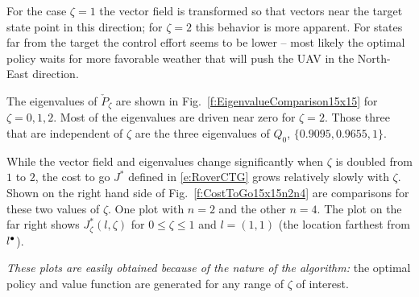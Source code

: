 \documentclass[final,12pt]{colt2018} %
\def\cP{{\check{P}}}
\def\varble{\,\cdot\,}
\def\Ebox#1#2{%
\begin{center}
\texttt{[image: \#2]} \end{center}}
\def\Fig#1{Fig.~\ref{#1}}
\begin{document}
For the case $\zeta=1$ the vector field is transformed so that vectors near the target state point in this direction; for $\zeta=2$ this behavior is  more apparent.   For states far from the target the control effort seems to be lower -- most likely the optimal policy waits for more favorable weather that will push the UAV in the North-East direction.






The eigenvalues of $\cP_\zeta$ are shown in \Fig{f:EigenvalueComparison15x15}
for $\zeta=0,1,2$.    Most of the eigenvalues are driven near zero for $\zeta=2$. 
Those three that are independent of $\zeta$ are  the three eigenvalues of $Q_0$,
$\{0.9095, 
    0.9655, 1   \}$.




While the vector field and eigenvalues change significantly when $\zeta$ is doubled from $1$ to $2$, the cost to go  $J^*$ defined in \eqref{e:RoverCTG} grows relatively slowly with $\zeta$.  Shown on the right hand side of \Fig{f:CostToGo15x15n2n4} are comparisons for these two values of $\zeta$.  One plot with $n=2$ and the other $n=4$.
The plot on the far right shows $J_\zeta^*(l,\zeta)$ for $0\le\zeta\le 1$ and $l=(1,1)$  (the location farthest from $l^{\bullet}$).   

\textit{These plots are easily obtained because of the nature of the algorithm:}   the optimal policy and value function are generated for any range of $\zeta$ of interest.



   


%   
\end{document}
